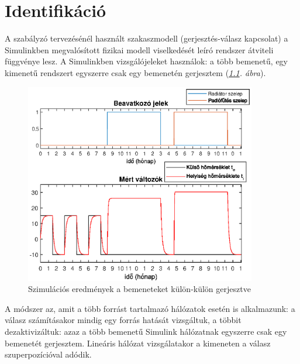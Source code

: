 \chapter{Identifikáció}\label{chap:ident}


A szabályzó tervezésénél használt szakaszmodell (gerjesztés-válasz kapcsolat) a Simulinkben megvalósított fizikai modell viselkedését leíró rendszer átviteli függvénye lesz. A Simulinkben vizsgálójeleket használok: a több bemenetű, egy kimenetű rendszert egyszerre csak egy bemenetén gerjesztem (\textit{\ref{fig:valve-step}. ábra}). 

\begin{figure}[H]
	\centering
	\includegraphics[trim=0 0 0 0, clip,width=0.9\textwidth]{figures/valve-step}
	\caption{Szimulációs eredmények a bemeneteket külön-külön gerjesztve}
	\label{fig:valve-step}
\end{figure}

A módszer az, amit a több forrást tartalmazó hálózatok esetén is alkalmazunk: a válasz számításakor mindig egy forrás hatását vizsgáltuk, a többit dezaktivizáltuk: azaz a több bemenetű Simulink hálózatnak egyszerre csak egy bemenetét gerjesztem. Lineáris hálózat vizsgálatakor a kimeneten a válasz szuperpozícióval adódik. 

